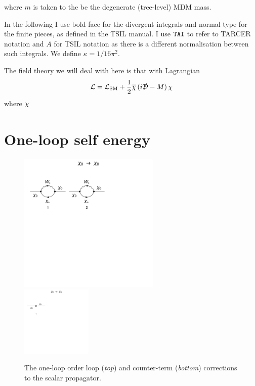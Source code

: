 \documentclass[11pt]{article}
\newcommand{\mychi}{\raisebox{0pt}[1ex][1ex]{$\chi$}}
\def\sp{\slashed{p}}
\begin{document}
where $m$ is taken to the be the degenerate (tree-level) MDM mass.



In the following I use bold-face for the divergent integrals and normal type for the finite pieces, as defined in the TSIL manual.  I use $\tt{TAI}$ to refer to TARCER notation and $A$ for TSIL notation as there is a different normalisation between such integrals.  We define $\kappa = 1/16\pi^2$.

The field theory we will deal with here is that with Lagrangian
\begin{align}
\mathcal{L}=\mathcal{L}_{\text{SM}}+\frac{1}{2}\overline{\mychi}\,(i\slashed{\mathcal{D}}-M)\,\mychi
\end{align}
where $\mychi$


\section{One-loop self energy}
\begin{figure}[h!]
\center
\includegraphics[width=0.6\textwidth]{1loop.pdf}\\
\includegraphics[width=0.3\textwidth]{1loop_1c.pdf}
\caption{The one-loop order loop (\textit{top}) and counter-term (\textit{bottom}) corrections to the scalar propagator.}\label{fig:1loop}
\end{figure}
\end{document}
